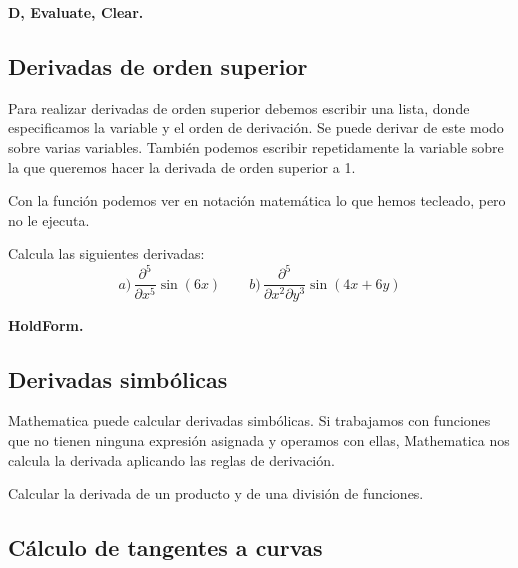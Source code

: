 \documentclass[a4paper,10pt, draft]{article}
\newcommand{\com}[1]{\textbf{\color{blue}{#1}}}
\newenvironment{ejer}{\begin{tcolorbox}[center title, title=Ejercicios,
fonttitle=\sffamily\bfseries,colback=blue!5,colframe=orange]}{\end{tcolorbox}}
\newenvironment{funciones}{\begin{tcolorbox}[center title, title=Nuevas funciones, fonttitle=\sffamily\bfseries, colback=green!5!white,colframe=red!75!black]}{\end{tcolorbox}\bigskip}
\begin{document}
\begin{funciones}

\textbf{D, Evaluate, Clear.}

\end{funciones}

\newpage


\subsection{Derivadas de orden superior}

Para realizar derivadas de orden superior debemos escribir una lista, donde especificamos la variable y el orden de derivación. Se puede derivar de este modo sobre varias variables. También podemos escribir repetidamente la variable sobre la que queremos hacer la derivada de orden superior a 1.

Con la función \com{HoldForm[expr]} podemos ver en notación matemática lo que hemos tecleado, pero no le ejecuta.

\begin{ejer}

Calcula las siguientes derivadas:
$$
a)\, \frac{\partial^5}{\partial x^5} \sin(6x) \qquad  b)\, \frac{\partial^5}{\partial x^2 \partial y^3} \sin(4x+6y)
$$

\end{ejer}  

\begin{funciones}

\textbf{HoldForm.}

\end{funciones}



\newpage

\subsection{Derivadas simbólicas}

Mathematica puede calcular derivadas simbólicas. Si trabajamos con funciones que no tienen ninguna expresión asignada y operamos con ellas, Mathematica nos calcula la derivada aplicando las reglas de derivación. 

\begin{ejer}

Calcular la derivada de un producto y de una división de funciones.

\end{ejer}  \newpage


\subsection{Cálculo de tangentes a curvas}
\end{document}
